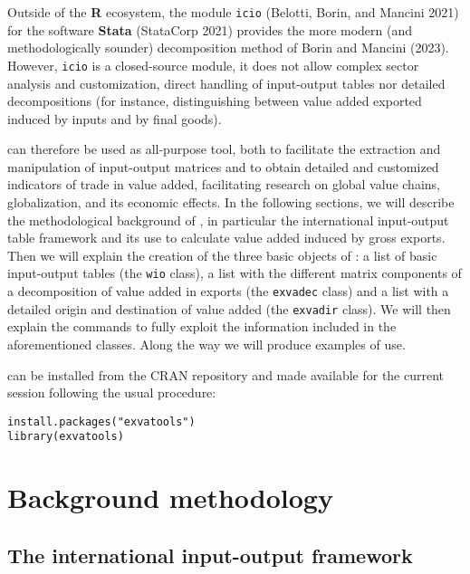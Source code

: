 Outside of the \textbf{R} ecosystem, the module \texttt{icio} (Belotti, Borin, and Mancini 2021) for the
software \textbf{Stata} (StataCorp 2021) provides the more modern (and
methodologically sounder) decomposition method of Borin and Mancini (2023).
However, \texttt{icio} is a closed-source module, it does not allow complex sector
analysis and customization, direct handling of input-output tables nor detailed
decompositions (for instance, distinguishing between value added exported
induced by inputs and by final goods).

 can therefore be used as all-purpose tool, both to
facilitate the extraction and manipulation of input-output matrices and to
obtain detailed and customized indicators of trade in value added, facilitating
research on global value chains, globalization, and its economic effects. In the
following sections, we will describe the methodological background of
, in particular the international input-output table
framework and its use to calculate value added induced by gross exports. Then we
will explain the creation of the three basic objects of : a
list of basic input-output tables (the \texttt{wio} class), a list with the different
matrix components of a decomposition of value added in exports (the \texttt{exvadec}
class) and a list with a detailed origin and destination of value added (the
\texttt{exvadir} class). We will then explain the commands to fully exploit the
information included in the aforementioned classes. Along the way we will
produce examples of use.

 can be installed from the CRAN repository and made
available for the current session following the usual procedure:

\begin{verbatim}
install.packages("exvatools")
library(exvatools)
\end{verbatim}

\hypertarget{background-methodology}{%
\section{Background methodology}\label{background-methodology}}

\hypertarget{the-international-input-output-framework}{%
\subsection{The international input-output framework}\label{the-international-input-output-framework}}

